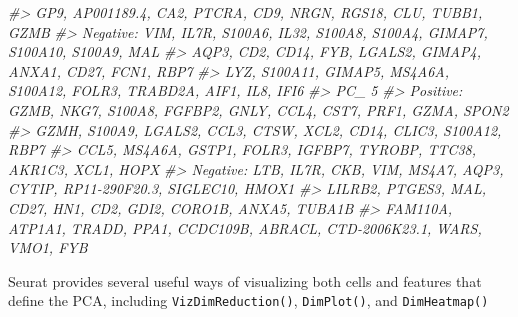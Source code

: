 \documentclass[
]{book}
\newenvironment{Shaded}{\begin{snugshade}}{\end{snugshade}}
\newcommand{\AttributeTok}[1]{\textcolor[rgb]{0.13,0.29,0.53}{#1}}
\newcommand{\CommentTok}[1]{\textcolor[rgb]{0.56,0.35,0.01}{\textit{#1}}}
\newcommand{\DecValTok}[1]{\textcolor[rgb]{0.00,0.00,0.81}{#1}}
\newcommand{\FunctionTok}[1]{\textcolor[rgb]{0.13,0.29,0.53}{\textbf{#1}}}
\newcommand{\NormalTok}[1]{#1}
\newcommand{\SpecialCharTok}[1]{\textcolor[rgb]{0.81,0.36,0.00}{\textbf{#1}}}
\newcommand{\StringTok}[1]{\textcolor[rgb]{0.31,0.60,0.02}{#1}}
\begin{document}
\begin{Shaded}
\begin{Highlighting}[]
\CommentTok{\#\textgreater{}     GP9, AP001189.4, CA2, PTCRA, CD9, NRGN, RGS18, CLU, TUBB1, GZMB }
\CommentTok{\#\textgreater{} Negative:  VIM, IL7R, S100A6, IL32, S100A8, S100A4, GIMAP7, S100A10, S100A9, MAL }
\CommentTok{\#\textgreater{}     AQP3, CD2, CD14, FYB, LGALS2, GIMAP4, ANXA1, CD27, FCN1, RBP7 }
\CommentTok{\#\textgreater{}     LYZ, S100A11, GIMAP5, MS4A6A, S100A12, FOLR3, TRABD2A, AIF1, IL8, IFI6 }
\CommentTok{\#\textgreater{} PC\_ 5 }
\CommentTok{\#\textgreater{} Positive:  GZMB, NKG7, S100A8, FGFBP2, GNLY, CCL4, CST7, PRF1, GZMA, SPON2 }
\CommentTok{\#\textgreater{}     GZMH, S100A9, LGALS2, CCL3, CTSW, XCL2, CD14, CLIC3, S100A12, RBP7 }
\CommentTok{\#\textgreater{}     CCL5, MS4A6A, GSTP1, FOLR3, IGFBP7, TYROBP, TTC38, AKR1C3, XCL1, HOPX }
\CommentTok{\#\textgreater{} Negative:  LTB, IL7R, CKB, VIM, MS4A7, AQP3, CYTIP, RP11{-}290F20.3, SIGLEC10, HMOX1 }
\CommentTok{\#\textgreater{}     LILRB2, PTGES3, MAL, CD27, HN1, CD2, GDI2, CORO1B, ANXA5, TUBA1B }
\CommentTok{\#\textgreater{}     FAM110A, ATP1A1, TRADD, PPA1, CCDC109B, ABRACL, CTD{-}2006K23.1, WARS, VMO1, FYB}
\end{Highlighting}
\end{Shaded}

Seurat provides several useful ways of visualizing both cells and features that define the PCA, including \texttt{VizDimReduction()}, \texttt{DimPlot()}, and \texttt{DimHeatmap()}

\begin{Shaded}
\end{Shaded}
\end{document}
